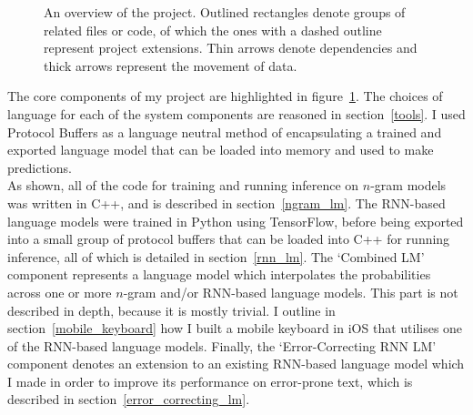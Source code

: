 \documentclass[a4paper, 12pt]{report}
\begin{document}
\begin{figure}[h]
\begin{adjustbox}{center}
\end{adjustbox}
\caption{An overview of the project. Outlined rectangles denote groups of related files or code, of which the ones with a dashed outline represent project extensions. Thin arrows denote dependencies and thick arrows represent the movement of data.}
\label{fig:system_overview}
\end{figure}

The core components of my project are highlighted in figure~\ref{fig:system_overview}. The choices of language for each of the system components are reasoned in section~\ref{tools}. I used Protocol Buffers as a language neutral method of encapsulating a trained and exported language model that can be loaded into memory and used to make predictions. \\

As shown, all of the code for training and running inference on $n$-gram models was written in C++, and is described in section~\ref{ngram_lm}. The RNN-based language models were trained in Python using TensorFlow, before being exported into a small group of protocol buffers that can be loaded into C++ for running inference, all of which is detailed in section~\ref{rnn_lm}. The `Combined LM' component represents a language model which interpolates the probabilities across one or more $n$-gram and/or RNN-based language models. This part is not described in depth, because it is mostly trivial. I outline in section~\ref{mobile_keyboard} how I built a mobile keyboard in iOS that utilises one of the RNN-based language models. Finally, the `Error-Correcting RNN LM' component denotes an extension to an existing RNN-based language model which I made in order to improve its performance on error-prone text, which is described in section~\ref{error_correcting_lm}. \\
\end{document}
